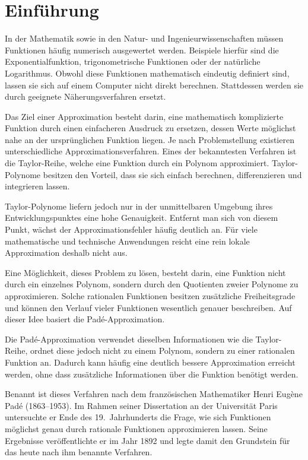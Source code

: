 %
\section{Einführung}
\label{pade:section:einfuehrung}

In der Mathematik sowie in den Natur- und Ingenieurwissenschaften müssen Funktionen häufig numerisch ausgewertet werden. Beispiele hierfür sind die Exponentialfunktion, trigonometrische Funktionen oder der natürliche Logarithmus. Obwohl diese Funktionen mathematisch eindeutig definiert sind, lassen sie sich auf einem Computer nicht direkt berechnen. Stattdessen werden sie durch geeignete Näherungsverfahren ersetzt.
%

Das Ziel einer Approximation besteht darin, eine mathematisch komplizierte Funktion durch einen einfacheren Ausdruck zu ersetzen, dessen Werte möglichst nahe an der ursprünglichen Funktion liegen. Je nach Problemstellung existieren unterschiedliche Approximationsverfahren. Eines der bekanntesten Verfahren ist die Taylor-Reihe, welche eine Funktion durch ein Polynom approximiert. Taylor-Polynome besitzen den Vorteil, dass sie sich einfach berechnen, differenzieren und integrieren lassen.
%

Taylor-Polynome liefern jedoch nur in der unmittelbaren Umgebung ihres Entwicklungspunktes eine hohe Genauigkeit. Entfernt man sich von diesem Punkt, wächst der Approximationsfehler häufig deutlich an. Für viele mathematische und technische Anwendungen reicht eine rein lokale Approximation deshalb nicht aus.

Eine Möglichkeit, dieses Problem zu lösen, besteht darin, eine Funktion nicht durch ein einzelnes Polynom, sondern durch den Quotienten zweier Polynome zu approximieren. Solche rationalen Funktionen besitzen zusätzliche Freiheitsgrade und können den Verlauf vieler Funktionen wesentlich genauer beschreiben. Auf dieser Idee basiert die Padé-Approximation.
%

Die Padé-Approximation verwendet dieselben Informationen wie die Taylor-Reihe, ordnet diese jedoch nicht zu einem Polynom, sondern zu einer rationalen Funktion an. Dadurch kann häufig eine deutlich bessere Approximation erreicht werden, ohne dass zusätzliche Informationen über die Funktion benötigt werden.
%

Benannt ist dieses Verfahren nach dem französischen Mathematiker Henri Eugène Padé (1863--1953). Im Rahmen seiner Dissertation an der Universität Paris untersuchte er Ende des 19.~Jahrhunderts die Frage, wie sich Funktionen möglichst genau durch rationale Funktionen approximieren lassen. Seine Ergebnisse veröffentlichte er im Jahr 1892 und legte damit den Grundstein für das heute nach ihm benannte Verfahren.
%

